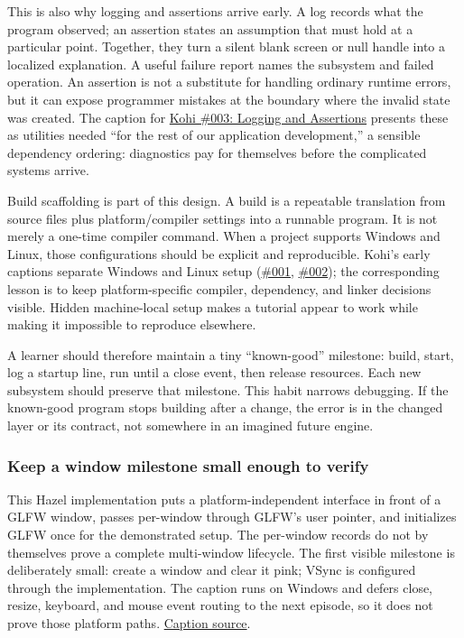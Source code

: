 This is also why logging and assertions arrive early. A log records what the program observed; an assertion states an assumption that must hold at a particular point. Together, they turn a silent blank screen or null handle into a localized explanation. A useful failure report names the subsystem and failed operation. An assertion is not a substitute for handling ordinary runtime errors, but it can expose programmer mistakes at the boundary where the invalid state was created. The caption for \href{https://www.youtube.com/watch?v=l9e8PJskYnI}{Kohi \#003: Logging and Assertions} presents these as utilities needed ``for the rest of our application development,'' a sensible dependency ordering: diagnostics pay for themselves before the complicated systems arrive.

Build scaffolding is part of this design. A build is a repeatable translation from source files plus platform/compiler settings into a runnable program. It is not merely a one-time compiler command. When a project supports Windows and Linux, those configurations should be explicit and reproducible. Kohi's early captions separate Windows and Linux setup (\href{https://www.youtube.com/watch?v=F6_WdnzQIQ4}{\#001}, \href{https://www.youtube.com/watch?v=NIv1mygBOcg}{\#002}); the corresponding lesson is to keep platform-specific compiler, dependency, and linker decisions visible. Hidden machine-local setup makes a tutorial appear to work while making it impossible to reproduce elsewhere.

A learner should therefore maintain a tiny ``known-good'' milestone: build, start, log a startup line, run until a close event, then release resources. Each new subsystem should preserve that milestone. This habit narrows debugging. If the known-good program stops building after a change, the error is in the changed layer or its contract, not somewhere in an imagined future engine.

\subsubsection{Keep a window milestone small enough to verify}\label{05-engine-i-ch013-keep-a-window-milestone-small-enough-to-verify}

\hypertarget{05-engine-i-ch013-keep-a-window-milestone-small-enough-to-verify}{}

This Hazel implementation puts a platform-independent  interface in front of a GLFW window, passes per-window  through GLFW's user pointer, and initializes GLFW once for the demonstrated setup. The per-window records do not by themselves prove a complete multi-window lifecycle. The first visible milestone is deliberately small: create a window and clear it pink; VSync is configured through the implementation. The caption runs on Windows and defers close, resize, keyboard, and mouse event routing to the next episode, so it does not prove those platform paths. \href{https://www.youtube.com/watch?v=88dmtleVywk}{Caption source}.

